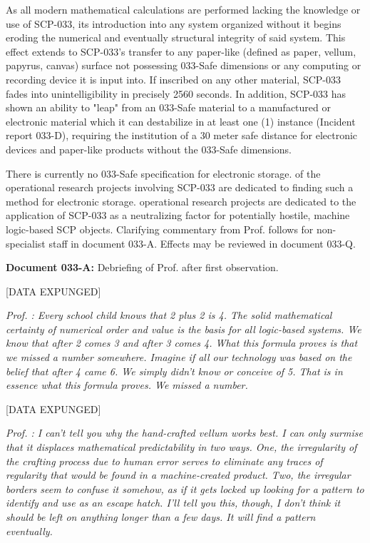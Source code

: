As all modern mathematical calculations are performed lacking the knowledge or use of SCP-033, its introduction into any system organized without it begins eroding the numerical and eventually structural integrity of said system. This effect extends to SCP-033's transfer to any paper-like (defined as paper, vellum, papyrus, canvas) surface not possessing 033-Safe dimensions or any computing or recording device it is input into. If inscribed on any other material, SCP-033 fades into unintelligibility in precisely 2560 seconds. In addition, SCP-033 has shown an ability to "leap" from an 033-Safe material to a manufactured or electronic material which it can destabilize in at least one (1) instance (Incident report 033-D), requiring the institution of a 30 meter safe distance for electronic devices and paper-like products without the 033-Safe dimensions.

There is currently no 033-Safe specification for electronic storage.  of the  operational research projects involving SCP-033 are dedicated to finding such a method for electronic storage.  operational research projects are dedicated to the application of SCP-033 as a neutralizing factor for potentially hostile, machine logic-based SCP objects. Clarifying commentary from Prof.  follows for non-specialist staff in document 033-A. Effects may be reviewed in document 033-Q.

\textbf{Document 033-A:} Debriefing of Prof.  after first observation.

[DATA EXPUNGED]

\textsl{Prof. : Every school child knows that 2 plus 2 is 4. The solid mathematical certainty of numerical order and value is the basis for all logic-based systems. We know that after 2 comes 3 and after 3 comes 4. What this formula proves is that we missed a number somewhere. Imagine if all our technology was based on the belief that after 4 came 6. We simply didn't know or conceive of 5. That is in essence what this formula proves. We missed a number.}

[DATA EXPUNGED]

\textsl{Prof. : I can't tell you why the hand-crafted vellum works best. I can only surmise that it displaces mathematical predictability in two ways. One, the irregularity of the crafting process due to human error serves to eliminate any traces of regularity that would be found in a machine-created product. Two, the irregular borders seem to confuse it somehow, as if it gets locked up looking for a pattern to identify and use as an escape hatch. I'll tell you this, though, I don't think it should be left on anything longer than a few days. It will find a pattern eventually.}

